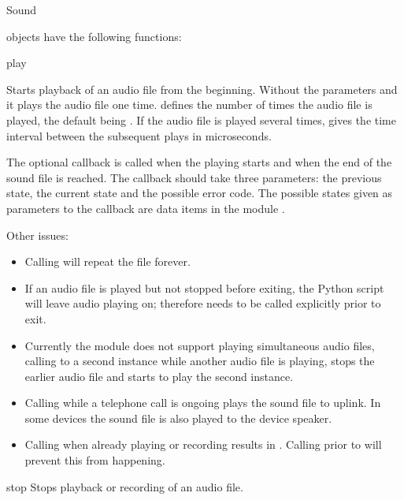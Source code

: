 \begin{classdesc*}{Sound}

 objects have the following functions:

\begin{methoddesc}[Sound]{play}{}

Starts playback of an audio file from the beginning. Without the parameters 
 and  it plays the audio file one time. 
 defines the number of times the audio file is played, the 
default being . If the audio file is played several times, 
 gives the time interval between the subsequent plays in 
microseconds. 

The optional callback is called when the playing starts and when the end of the 
sound file is reached. The callback should take three parameters: the previous 
state, the current state and the possible error code. The possible states given 
as parameters to the callback are data items in the module .

Other issues: 

\begin{itemize}
\item Calling  will repeat the file forever. 
\item If an audio file is played but not stopped before exiting, the Python script will leave audio playing on; therefore  needs to be called explicitly prior to exit.
\item Currently the module does not support playing simultaneous audio files, calling  to a second  instance while another audio file is playing, stops the earlier audio file and starts to play the second  instance.
\item Calling  while a telephone call is ongoing plays the sound file to uplink. In some devices the sound file is also played to the device speaker.
\item Calling  when already playing or recording results in . Calling  prior to  will prevent this from happening.
\end{itemize}
\end{methoddesc}

\begin{methoddesc}[Sound]{stop}{}
Stops playback or recording of an audio file.
\end{methoddesc}


\end{classdesc*}
